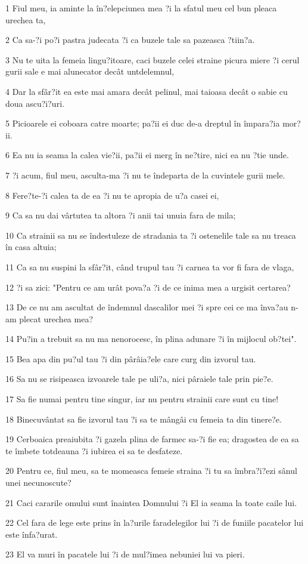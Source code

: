 \par 1 Fiul meu, ia aminte la în?elepciunea mea ?i la sfatul meu cel bun pleaca urechea ta,
\par 2 Ca sa-?i po?i pastra judecata ?i ca buzele tale sa pazeasca ?tiin?a.
\par 3 Nu te uita la femeia lingu?itoare, caci buzele celei straine picura miere ?i cerul gurii sale e mai alunecator decât untdelemnul,
\par 4 Dar la sfâr?it ea este mai amara decât pelinul, mai taioasa decât o sabie cu doua ascu?i?uri.
\par 5 Picioarele ei coboara catre moarte; pa?ii ei duc de-a dreptul în împara?ia mor?ii.
\par 6 Ea nu ia seama la calea vie?ii, pa?ii ei merg în ne?tire, nici ea nu ?tie unde.
\par 7 ?i acum, fiul meu, asculta-ma ?i nu te îndeparta de la cuvintele gurii mele.
\par 8 Fere?te-?i calea ta de ea ?i nu te apropia de u?a casei ei,
\par 9 Ca sa nu dai vârtutea ta altora ?i anii tai unuia fara de mila;
\par 10 Ca strainii sa nu se îndestuleze de stradania ta ?i ostenelile tale sa nu treaca în casa altuia;
\par 11 Ca sa nu suspini la sfâr?it, când trupul tau ?i carnea ta vor fi fara de vlaga,
\par 12 ?i sa zici: "Pentru ce am urât pova?a ?i de ce inima mea a urgisit certarea?
\par 13 De ce nu am ascultat de îndemnul dascalilor mei ?i spre cei ce ma înva?au n-am plecat urechea mea?
\par 14 Pu?in a trebuit sa nu ma nenorocesc, în plina adunare ?i în mijlocul ob?tei".
\par 15 Bea apa din pu?ul tau ?i din pârâia?ele care curg din izvorul tau.
\par 16 Sa nu se risipeasca izvoarele tale pe uli?a, nici pâraiele tale prin pie?e.
\par 17 Sa fie numai pentru tine singur, iar nu pentru strainii care sunt cu tine!
\par 18 Binecuvântat sa fie izvorul tau ?i sa te mângâi cu femeia ta din tinere?e.
\par 19 Cerboaica preaiubita ?i gazela plina de farmec sa-?i fie ea; dragostea de ea sa te îmbete totdeauna ?i iubirea ei sa te desfateze.
\par 20 Pentru ce, fiul meu, sa te momeasca femeie straina ?i tu sa îmbra?i?ezi sânul unei necunoscute?
\par 21 Caci cararile omului sunt înaintea Domnului ?i El ia seama la toate caile lui.
\par 22 Cel fara de lege este prins în la?urile faradelegilor lui ?i de funiile pacatelor lui este înfa?urat.
\par 23 El va muri în pacatele lui ?i de mul?imea nebuniei lui va pieri.

